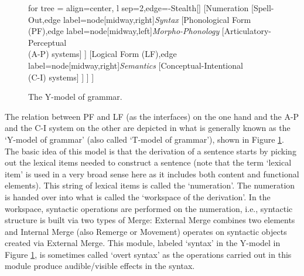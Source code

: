 \begin{figure}
	\caption{The Y-model of grammar.\label{ymodel}}
	\begin{forest}
	for tree = {align=center, l sep=2\baselineskip,edge={-{Stealth[]}}}
	[Numeration
        [Spell-Out,edge label={node[midway,right]{\itshape Syntax}}
            [Phonological Form (PF),edge label={node[midway,left]{\itshape Morpho-Phonology\hspace*{1em}}}
                [Articulatory-Perceptual\\(A-P) systems]
            ]
            [Logical Form (LF),edge label={node[midway,right]{\hspace{1em}\itshape Semantics}}
                [Conceptual-Intentional\\(C-I) systems]
            ]
        ]
	]
	\end{forest}
\end{figure}

The relation between PF and LF (as the interfaces) on the one hand and the A-P and the C-I system on the other are depicted in what is generally known as the `Y-model of grammar' (also called `T-model of grammar'), shown in Figure \ref{ymodel}. The basic idea of this model is that the derivation of a sentence starts by picking out the lexical items needed to construct a sentence (note that the term `lexical item' is used in a very broad sense here as it includes both content and functional elements). This string of lexical items is called the `numeration'. The numeration is handed over into what is called the `workspace of the derivation'. In the workspace, syntactic operations are performed on the numeration, i.e., syntactic structure is built via two types of Merge: External Merge combines two elements and Internal Merge (also Remerge or Movement) operates on syntactic objects created via External Merge. This module, labeled `syntax' in the Y-model in Figure \ref{ymodel}, is sometimes called `overt syntax' as the operations carried out in this module produce audible/visible effects in the syntax.

